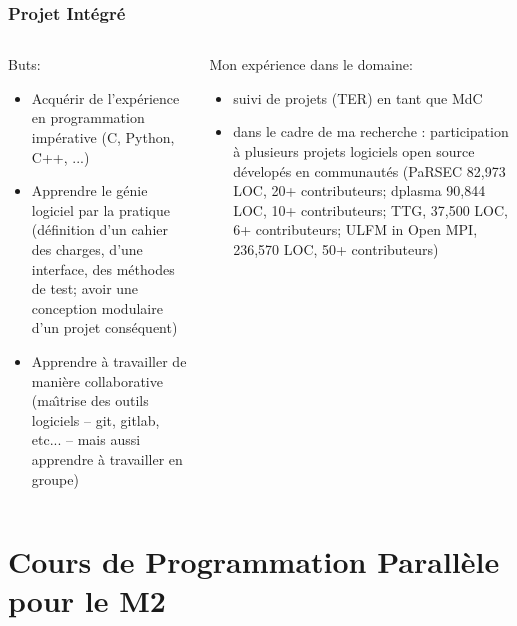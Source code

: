 \documentclass[compress,aspectratio=169]{beamer}
\begin{document}
\begin{frame}
  \frametitle{Projet Int\'egr\'e}

  \begin{columns}
    \begin{column}{.45\linewidth}\small
      Buts:
      \begin{itemize}
      \item Acqu\'erir de l'exp\'erience en programmation imp\'erative (C, Python, C++, ...)
      \item Apprendre le g\'enie logiciel par la pratique (d\'efinition d'un cahier des charges, d'une interface, des m\'ethodes de test; avoir une conception modulaire d'un projet cons\'equent)
      \item Apprendre \`a travailler de mani\`ere collaborative (ma\^\i{}trise des outils logiciels -- git, gitlab, etc... -- mais aussi apprendre \`a travailler en groupe)
      \end{itemize}
    \end{column}\begin{column}{.45\linewidth}\small
      Mon exp\'erience dans le domaine:
      \begin{itemize}
      \item suivi de projets (TER) en tant que MdC
      \item dans le cadre de ma recherche : participation \`a plusieurs projets logiciels open source d\'evelop\'es en communaut\'es (PaRSEC 82,973 LOC, 20+ contributeurs; dplasma 90,844 LOC, 10+ contributeurs; TTG, 37,500 LOC, 6+ contributeurs; ULFM in Open MPI, 236,570 LOC, 50+ contributeurs)
      \end{itemize}
    \end{column}
  \end{columns}
\end{frame}

\section{Cours de Programmation Parall\`ele pour le M2}
\end{document}
